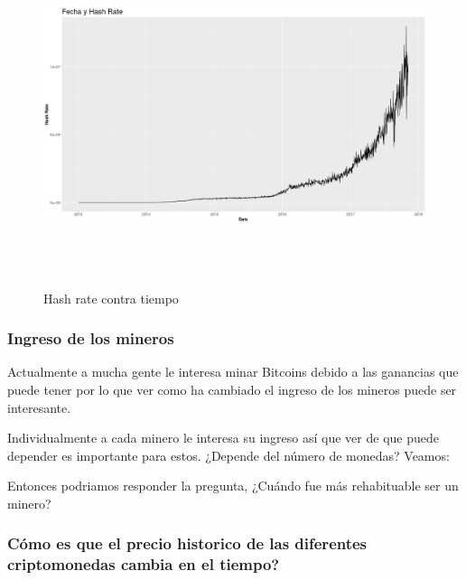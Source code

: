 \documentclass[12pt,letterpaper]{article}
\begin{document}
    \begin{figure}
        \centering

        \includegraphics[width = 18cm, height = 10cm]{btc/date_vs_hashRate}

        \caption{Hash rate contra tiempo}
    \end{figure}

   \subsubsection*{Ingreso de los mineros}

    Actualmente a mucha gente le interesa minar Bitcoins debido a las ganancias que puede tener por lo que ver como ha cambiado el ingreso de los mineros puede ser interesante.


    Individualmente a cada minero le interesa su ingreso así que ver de que puede depender es importante para estos. ¿Depende del número de monedas? Veamos:


    
    Entonces podriamos responder la pregunta, ¿Cuándo fue más rehabituable ser un minero?



	\subsubsection*{C\'omo es que el precio historico de las diferentes criptomonedas cambia en el tiempo?}
\end{document}
